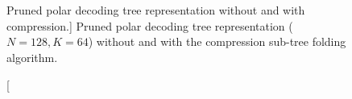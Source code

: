 \begin{figure}[htp]
  \centering
  \\
  \\
  \caption
    [Pruned polar decoding tree representation without and with compression.]
    {Pruned polar decoding tree representation ($N = 128, K = 64$) without
    and with the compression sub-tree folding algorithm.}
  \label{fig:eval_polar_sc_gen_compression}
\end{figure}

